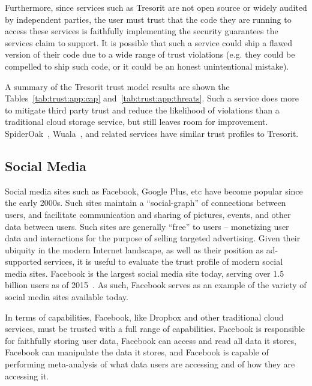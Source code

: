 Furthermore, since services such as Tresorit are not open source or
widely audited by independent parties, the user must trust that the
code they are running to access these services is faithfully
implementing the security guarantees the services claim to
support. It is possible that such a service could ship a flawed
version of their code due to a wide range of trust violations
(e.g. they could be compelled to ship such code, or it could be an
honest unintentional mistake).

A summary of the Tresorit trust model results are shown the
Tables~\ref{tab:trust:app:cap} and~\ref{tab:trust:app:threats}. Such a
service does more to mitigate third party trust and reduce the
likelihood of violations than a traditional cloud storage service, but
still leaves room for improvement. SpiderOak~\cite{spideroak},
Wuala~\cite{wuala}, and related services have similar trust profiles
to Tresorit.

\subsection{Social Media}

Social media sites such as Facebook, Google Plus, etc have become
popular since the early 2000s. Such sites maintain a ``social-graph''
of connections between users, and facilitate communication and sharing
of pictures, events, and other data between users. Such sites are
generally ``free'' to users -- monetizing user data and interactions
for the purpose of selling targeted advertising. Given their ubiquity
in the modern Internet landscape, as well as their position as
ad-supported services, it is useful to evaluate the trust profile of
modern social media sites. Facebook is the largest social media site
today, serving over 1.5 billion users as of 2015~\cite{foster2014}. As
such, Facebook serves as an example of the variety of social media
sites available today.

In terms of capabilities, Facebook, like Dropbox and other traditional
cloud services, must be trusted with a full range of
capabilities. Facebook is responsible for faithfully storing user
data, Facebook can access and read all data it stores, Facebook can
manipulate the data it stores, and Facebook is capable of performing
meta-analysis of what data users are accessing and of how they are
accessing it.

